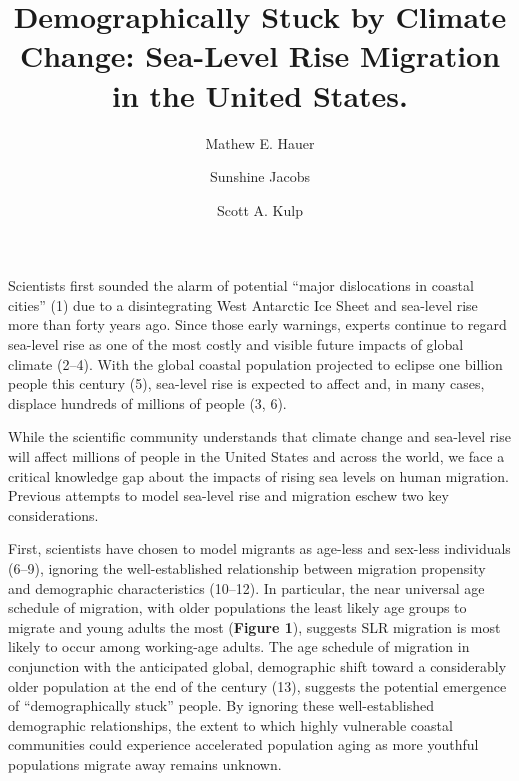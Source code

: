\documentclass[9pt,twocolumn,twoside,]{pnas-new}
\title{Demographically Stuck by Climate Change: Sea-Level Rise Migration
in the United States.}
\author[a,1,2]{Mathew E. Hauer}
\author[a,b]{Sunshine Jacobs}
\author[c]{Scott A. Kulp}
\affil[a]{Department of Sociology, Florida State University}
\affil[b]{Center for Demography and Population Health, Florida State
University}
\affil[c]{Climate Central}
\begin{document}
\verticaladjustment{-2pt}

\maketitle
\thispagestyle{firststyle}



Scientists first sounded the alarm of potential ``major dislocations in
coastal cities'' (1) due to a disintegrating West Antarctic Ice Sheet
and sea-level rise more than forty years ago. Since those early
warnings, experts continue to regard sea-level rise as one of the most
costly and visible future impacts of global climate (2--4). With the
global coastal population projected to eclipse one billion people this
century (5), sea-level rise is expected to affect and, in many cases,
displace hundreds of millions of people (3, 6).

While the scientific community understands that climate change and
sea-level rise will affect millions of people in the United States and
across the world, we face a critical knowledge gap about the impacts of
rising sea levels on human migration. Previous attempts to model
sea-level rise and migration eschew two key considerations.

First, scientists have chosen to model migrants as age-less and sex-less
individuals (6--9), ignoring the well-established relationship between
migration propensity and demographic characteristics (10--12). In
particular, the near universal age schedule of migration, with older
populations the least likely age groups to migrate and young adults the
most (\textbf{Figure 1}), suggests SLR migration is most likely to occur
among working-age adults. The age schedule of migration in conjunction
with the anticipated global, demographic shift toward a considerably
older population at the end of the century (13), suggests the potential
emergence of ``demographically stuck'' people. By ignoring these
well-established demographic relationships, the extent to which highly
vulnerable coastal communities could experience accelerated population
aging as more youthful populations migrate away remains unknown.
\end{document}
